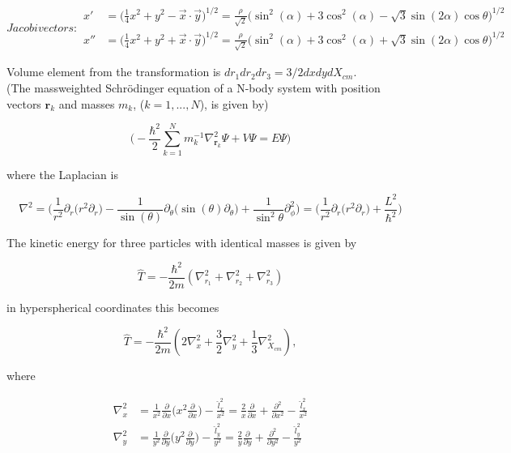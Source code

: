 \documentclass{article}
\begin{document}
\begin{subequations}
Jacobi vectors:
\begin{align}
        x' &= \Big(\frac{1}{4} x^2 +y^2 -\vec{x} \cdot \vec{y}\Big)^{1/2} = \frac{\rho}{\sqrt{2}} \big( \sin^2(\alpha) + 3\cos^2(\alpha) - \sqrt{3}\sin(2\alpha)\cos{\theta}\big)^{1/2}\\
        x'' &= \Big(\frac{1}{4} x^2 +y^2 +\vec{x} \cdot \vec{y}\Big)^{1/2} = \frac{\rho}{\sqrt{2}} \big( \sin^2(\alpha) + 3\cos^2(\alpha) + \sqrt{3}\sin(2\alpha)\cos{\theta}\big)^{1/2}
\end{align}
\end{subequations}

Volume element from the transformation is $dr_1dr_2dr_3=3/2dxdydX_{cm}$.\\


(The massweighted Schr{\"o}dinger equation of a N-body system with position vectors $\mathbf{r}_k$ and masses $m_k$, ($k=1,...,N$), is given by)

\begin{equation}
\Bigg(-\frac{\hbar^2}{2} \sum_{k=1}^{N} m^{-1}_{k} \nabla^{2}_{\mathbf{r}_{k}} \Psi + V\Psi = E \Psi \Bigg)
\end{equation}

where the Laplacian is

\begin{equation}
\nabla^{2} = \Big( \frac{1}{r^2}\partial_{r} \big(r^2 \partial_{r}\big) - \frac{1}{\sin(\theta)} \partial_{\theta} \big( \sin(\theta) \partial_{\theta} \big) + \frac{1}{\sin^2{\theta}} \partial^{2}_{\phi} \Big) = \Big( \frac{1}{r^2} \partial_{r} \big( r^2 \partial_{r} \big) + \frac{L^2}{\hbar^2} \Big)
\end{equation}

The kinetic energy for three particles with identical masses is given by

\begin{equation}
\hat{T} = -\frac{\hbar^2}{2m}( \nabla^{2}_{r_1} + \nabla^{2}_{r_2} + \nabla^{2}_{r_3} )
\end{equation}

in hyperspherical coordinates this becomes 

\begin{equation}
\hat{T} = -\frac{\hbar^2}{2m}( 2\nabla^{2}_{x} + \frac{3}{2}\nabla^{2}_{y} + \frac{1}{3}\nabla^{2}_{X_{cm}} ),
\end{equation}

where

\begin{subequations}
\begin{align}
	\nabla^2_{x} &= \frac{1}{x^2}\frac{\partial}{\partial x} \Big( x^2 \frac{\partial}{\partial x} \Big) - \frac{\hat{l}^2_{x}}{x^2} = \frac{2}{x}\frac{\partial}{\partial x} + \frac{\partial^2}{\partial x^{2}} - \frac{\hat{l}^{2}_{x}}{x^2}\\
	\nabla^2_{y} &= \frac{1}{y^2}\frac{\partial}{\partial y} \Big( y^2 \frac{\partial}{\partial y} \Big) - \frac{\hat{l}^2_{y}}{y^2} = \frac{2}{y}\frac{\partial}{\partial y} + \frac{\partial^2}{\partial y^{2}} - \frac{\hat{l}^{2}_{y}}{y^2}
\end{align}
\end{subequations}
\end{document}
